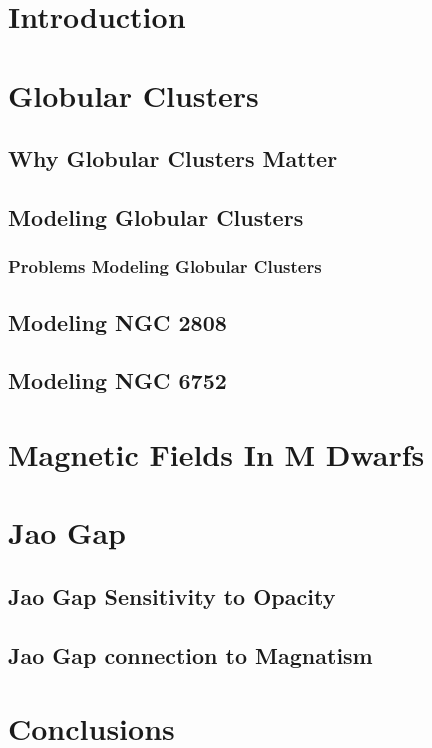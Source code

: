 \documentclass{GuariniThesis}
\begin{document}
\makePrelim

\chapter{Introduction}

\chapter{Globular Clusters}
\section{Why Globular Clusters Matter}
\section{Modeling Globular Clusters}
\subsection{Problems Modeling Globular Clusters}
\section{Modeling NGC 2808}
\section{Modeling NGC 6752}

\chapter{Magnetic Fields In M Dwarfs}


\chapter{Jao Gap}
\section{Jao Gap Sensitivity to Opacity}


\section{Jao Gap connection to Magnatism}

\chapter{Conclusions}

\end{document}
